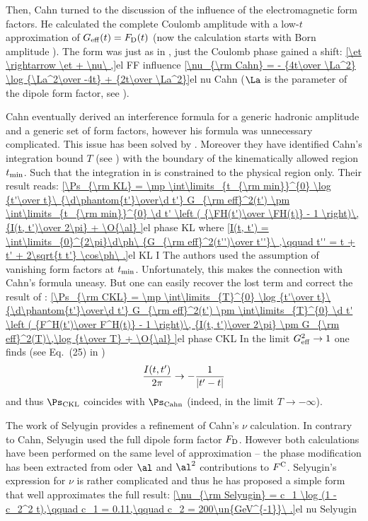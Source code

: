 Then, Cahn turned to the discussion of the influence of the electromagnetic form factors. He calculated the complete Coulomb amplitude with a low-$t$ approximation of $G_{\rm eff}(t) = F_{\rm D}(t)$ (now the calculation starts with Born amplitude ). The form was just as in , just the Coulomb phase gained a shift:
\eqref{\et \rightarrow \et + \nu\ ,}{el FF influence}
\eqref{\nu_{\rm Cahn} = - {4t\over \La^2} \log {\La^2\over -4t} + {2t\over \La^2}}{el nu Cahn}
($\La$ is the parameter of the dipole form factor, see ).

Cahn eventually derived an interference formula for a generic hadronic amplitude and a generic set of form factors, however his formula was unnecessary complicated. This issue has been solved by \KaL{} . Moreover they have identified Cahn's integration bound $T$ (see ) with the boundary of the kinematically allowed region $t_{\rm min}$. Such that the integration in  is constrained to the physical region only. Their result reads:
\eqref{\Ps_{\rm KL} =
	\mp \int\limits_{t_{\rm min}}^{0} \log {t'\over t}\ {\d\phantom{t'}\over\d t'} G_{\rm eff}^2(t')
	\pm \int\limits_{t_{\rm min}}^{0} \d t' \left ( {\FH(t')\over \FH(t)} - 1 \right)\, {I(t, t')\over 2\pi}
	+ \O{\al}
}{el phase KL}
where
\eqref{I(t, t') = \int\limits_{0}^{2\pi}\d\ph\ {G_{\rm eff}^2(t'')\over t''}\ ,\qquad t'' = t + t' + 2\sqrt{t t'} \cos\ph\ .}{el KL I}
The authors used the assumption of vanishing form factors at $t_{\rm min}$. Unfortunately, this makes the connection with Cahn's formula  uneasy. But one can easily recover the lost term and correct the result of \KL{}:
\eqref{\Ps_{\rm CKL} =
	\mp \int\limits_{T}^{0} \log {t'\over t}\ {\d\phantom{t'}\over\d t'} G_{\rm eff}^2(t')
	\pm \int\limits_{T}^{0} \d t' \left ( {F^H(t')\over F^H(t)} - 1 \right)\, {I(t, t')\over 2\pi}
	\pm G_{\rm eff}^2(T)\,\log {t\over T}
	+ \O{\al}
}{el phase CKL}
In the limit $G_{\rm eff}^2\to 1$ one finds (see Eq.~(25) in )
$${I(t, t')\over 2\pi}\to - {1\over |t' - t|}$$
and thus $\Ps_{\rm CKL}$ coincides with $\Ps_{\rm Cahn}$ (indeed, in the limit $T\to -\infty$).

The work of Selyugin  provides a refinement of Cahn's $\nu$ calculation. In contrary to Cahn, Selyugin used the full dipole form factor $F_{\rm D}$. However both calculations have been performed on the same level of approximation -- the phase modification has been extracted from oder $\al$ and $\al^2$ contributions to $F^{\rm C}$. Selyugin's expression for $\nu$ is rather complicated and thus he has proposed a simple form that well approximates the full result:
\eqref{\nu_{\rm Selyugin} = c_1 \log (1 - c_2^2 t),\qquad c_1 = 0.11,\qquad c_2 = 200\un{GeV^{-1}}\ .}{el nu Selyugin}

